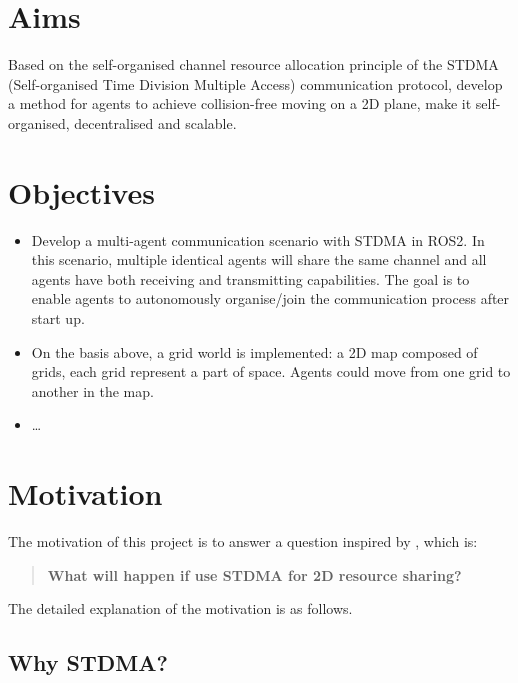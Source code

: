 \section{Aims}

Based on the self-organised channel resource allocation principle of the STDMA
(Self-organised Time Division Multiple Access) \cite{STDMA} communication protocol, develop
a method for agents to achieve collision-free moving on a 2D plane, make it self-organised,
decentralised and scalable.



\section{Objectives}


\begin{itemize}
    \item  Develop a multi-agent communication scenario with STDMA in ROS2. In this 
    scenario, multiple identical agents will share the same channel and all agents
    have both receiving and transmitting capabilities. The goal is to enable agents to
    autonomously organise/join the communication process after start up. 
    \item On the basis above, a grid world is implemented: a 2D map composed of grids, 
    each grid represent a part of space. Agents could move from one grid to another in the map.
    \item \dots
\end{itemize}

\section{Motivation}

The motivation of this project is to answer a question inspired by \cite{Paper_From_Supervisor}, which is:

\begin{quote}
    \textbf{What will happen if use STDMA for 2D resource sharing?}
\end{quote}

The detailed explanation of the motivation is as follows.

\subsection{Why STDMA?}

